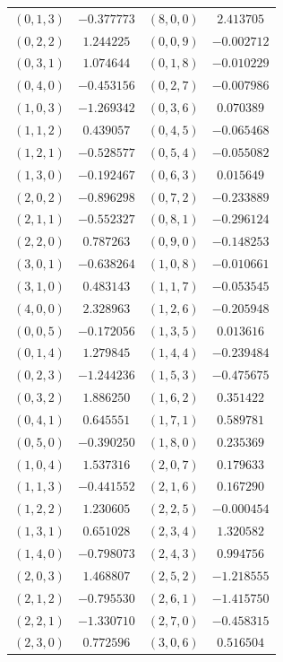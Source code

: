 \begin{table}
\begin{tabular}{cc@{\qquad}cc}
$(0,1,3)$ & $-0.377773$ & $(8,0,0)$ & $2.413705$ \\
$(0,2,2)$ & $1.244225$ & $(0,0,9)$ & $-0.002712$ \\
$(0,3,1)$ & $1.074644$ & $(0,1,8)$ & $-0.010229$ \\
$(0,4,0)$ & $-0.453156$ & $(0,2,7)$ & $-0.007986$ \\
$(1,0,3)$ & $-1.269342$ & $(0,3,6)$ & $0.070389$ \\
$(1,1,2)$ & $0.439057$ & $(0,4,5)$ & $-0.065468$ \\
$(1,2,1)$ & $-0.528577$ & $(0,5,4)$ & $-0.055082$ \\
$(1,3,0)$ & $-0.192467$ & $(0,6,3)$ & $0.015649$ \\
$(2,0,2)$ & $-0.896298$ & $(0,7,2)$ & $-0.233889$ \\
$(2,1,1)$ & $-0.552327$ & $(0,8,1)$ & $-0.296124$ \\
$(2,2,0)$ & $0.787263$ & $(0,9,0)$ & $-0.148253$ \\
$(3,0,1)$ & $-0.638264$ & $(1,0,8)$ & $-0.010661$ \\
$(3,1,0)$ & $0.483143$ & $(1,1,7)$ & $-0.053545$ \\
$(4,0,0)$ & $2.328963$ & $(1,2,6)$ & $-0.205948$ \\
$(0,0,5)$ & $-0.172056$ & $(1,3,5)$ & $0.013616$ \\
$(0,1,4)$ & $1.279845$ & $(1,4,4)$ & $-0.239484$ \\
$(0,2,3)$ & $-1.244236$ & $(1,5,3)$ & $-0.475675$ \\
$(0,3,2)$ & $1.886250$ & $(1,6,2)$ & $0.351422$ \\
$(0,4,1)$ & $0.645551$ & $(1,7,1)$ & $0.589781$ \\
$(0,5,0)$ & $-0.390250$ & $(1,8,0)$ & $0.235369$ \\
$(1,0,4)$ & $1.537316$ & $(2,0,7)$ & $0.179633$ \\
$(1,1,3)$ & $-0.441552$ & $(2,1,6)$ & $0.167290$ \\
$(1,2,2)$ & $1.230605$ & $(2,2,5)$ & $-0.000454$ \\
$(1,3,1)$ & $0.651028$ & $(2,3,4)$ & $1.320582$ \\
$(1,4,0)$ & $-0.798073$ & $(2,4,3)$ & $0.994756$ \\
$(2,0,3)$ & $1.468807$ & $(2,5,2)$ & $-1.218555$ \\
$(2,1,2)$ & $-0.795530$ & $(2,6,1)$ & $-1.415750$ \\
$(2,2,1)$ & $-1.330710$ & $(2,7,0)$ & $-0.458315$ \\
$(2,3,0)$ & $0.772596$ & $(3,0,6)$ & $0.516504$ \\

\end{tabular}
\end{table}
